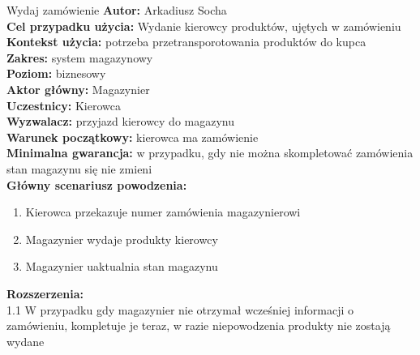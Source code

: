 	\begin{usecase}{Wydaj zamówienie}
		\textbf{Autor:} Arkadiusz Socha\\
		\textbf{Cel przypadku użycia:} Wydanie kierowcy produktów, ujętych w zamówieniu \\
		\textbf{Kontekst użycia:} potrzeba przetransporotowania produktów do kupca\\
		\textbf{Zakres:} system magazynowy \\
		\textbf{Poziom:} biznesowy \\
		\textbf{Aktor główny:} Magazynier \\
		\textbf{Uczestnicy:} Kierowca \\
		\textbf{Wyzwalacz:} przyjazd kierowcy do magazynu \\
		\textbf{Warunek początkowy:} kierowca ma zamówienie \\
		\textbf{Minimalna gwarancja:} w przypadku, gdy nie można skompletować zamówienia stan magazynu się nie zmieni \\
		\textbf{Główny scenariusz powodzenia:} 
			\begin{enumerate}
				\item Kierowca przekazuje numer zamówienia magazynierowi
				\item Magazynier wydaje produkty kierowcy
				\item Magazynier uaktualnia stan magazynu
			\end{enumerate}
		\textbf{Rozszerzenia:} \\
		1.1 W przypadku gdy magazynier nie otrzymał wcześniej informacji o zamówieniu, kompletuje je teraz, w razie niepowodzenia produkty nie zostają wydane\\
	\end{usecase}

